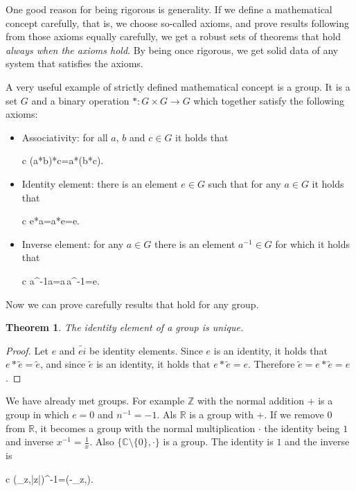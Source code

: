 \documentclass[11pt,oneside,%
]{memoir}
\newenvironment{eqna}{\begin{IEEEeqnarray}{c}}{\end{IEEEeqnarray}\ignorespacesafterend}
\newtheorem{teoreema}{Theorem}
\theoremstyle{definition}
\newcommand{\RR}{\mathbb{R}}
\newcommand{\CC}{\mathbb{C}}
\newcommand{\ZZ}{\mathbb{Z}}
\begin{document}
One good reason for being rigorous is generality. If we define a mathematical concept carefully, that is, we choose so-called axioms, and prove results following from those axioms equally carefully, we get a robust sets of theorems that hold \emph{always when the axioms hold}. By being once rigorous, we get solid data of any system that satisfies the axioms.

A very useful example of strictly defined mathematical concept is a group. It is a set \(G\) and a binary operation \(*:G\times G\rightarrow G\) which together satisfy the following axioms:
\begin{itemize}
    \item Associativity: for all \(a\), \(b\) and \(c\in G\) it holds that
    \begin{eqna}
        (a*b)*c=a*(b*c).
    \end{eqna}
    \item Identity element: there is an element \(e\in G\) such that for any \(a\in G\) it holds that
    \begin{eqna}
        e*a=a*e=e.
    \end{eqna}
    \item Inverse element: for any \(a\in G\) there is an element \(a^{-1}\in G\) for which it holds that
    \begin{eqna}
        a^{-1}a=a\,a^{-1}=e.
    \end{eqna}
\end{itemize}
Now we can prove carefully results that hold for any group.
\begin{teoreema}
The identity element of a group is unique.
\end{teoreema}
\begin{proof}
Let \(e\) and \(\tilde{ei}\) be identity elements. Since \(e\) is an identity, it holds that \(e*\tilde{e}=\tilde{e}\), and since \(\tilde{e}\) is an identity, it holds that \(e*\tilde{e}=e\). Therefore \(\tilde{e}=e*\tilde{e}=e\).
\end{proof}

We have already met groups. For example \(\ZZ\) with the normal addition \(+\) is a group in which \(e=0\) and \(n^{-1}=-1\). Als \(\RR\) is a group with \(+\). If we remove \(0\) from \(\RR\), it becomes a group with the normal multiplication \(\cdot\) the identity being \(1\) and inverse \(x^{-1}=\frac{1}{x}\). Also \(\lbrace\CC\setminus\lbrace{0}\rbrace,\cdot\rbrace\) is a group. The identity is \(1\) and the inverse is
\begin{eqna}
    (\theta_z,|z|)^{-1}=(-\theta_z,).
\end{eqna}
\end{document}
